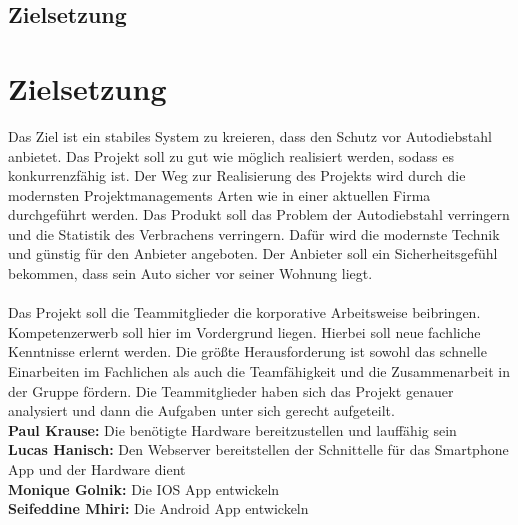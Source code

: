 \section{Zielsetzung}
\chapter{Zielsetzung}
Das Ziel ist ein stabiles System zu kreieren, dass den Schutz vor Autodiebstahl anbietet. Das Projekt soll zu gut wie möglich realisiert werden, sodass es konkurrenzfähig ist. 
Der Weg zur Realisierung des Projekts wird durch die modernsten Projektmanagements Arten wie in einer aktuellen Firma durchgeführt werden. 
Das Produkt soll das Problem der Autodiebstahl verringern und die Statistik des Verbrachens verringern. Dafür wird die modernste Technik und günstig für den Anbieter angeboten.
 Der Anbieter soll ein Sicherheitsgefühl bekommen, dass sein Auto sicher vor seiner Wohnung liegt.\\\\
Das Projekt soll die Teammitglieder die korporative Arbeitsweise beibringen. 
Kompetenzerwerb soll hier im Vordergrund liegen. Hierbei soll neue fachliche Kenntnisse erlernt werden.
Die größte Herausforderung ist sowohl das schnelle Einarbeiten im Fachlichen als auch die Teamfähigkeit und die Zusammenarbeit in der Gruppe fördern.
Die Teammitglieder haben sich das Projekt genauer analysiert und dann die Aufgaben unter sich gerecht aufgeteilt.\\
\textbf{Paul Krause:} Die benötigte Hardware bereitzustellen und lauffähig sein\\
\textbf{Lucas Hanisch:} Den Webserver bereitstellen der Schnittelle für das Smartphone App und der Hardware dient\\
\textbf{Monique Golnik:} Die IOS App entwickeln\\
\textbf{Seifeddine Mhiri:} Die Android App entwickeln\\